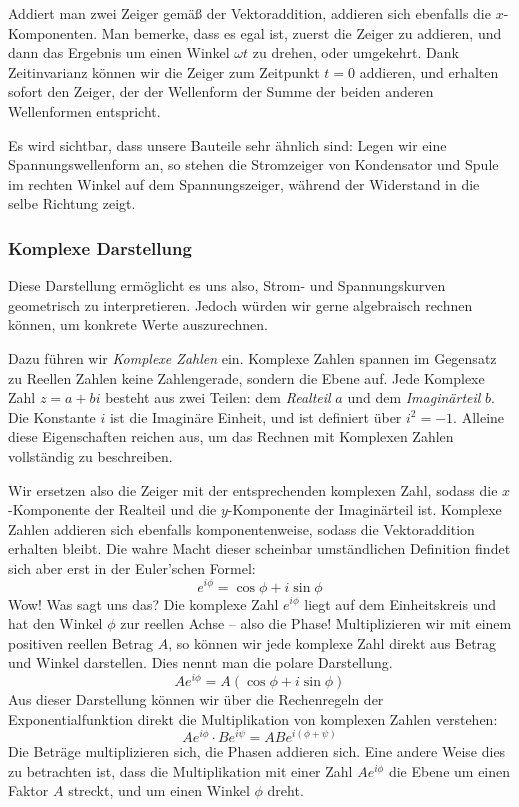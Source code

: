 Addiert man zwei Zeiger gemäß der Vektoraddition, addieren sich ebenfalls die $x$-Komponenten. Man bemerke, dass es egal
ist, zuerst die Zeiger zu addieren, und dann das Ergebnis um einen Winkel $\omega t$ zu drehen, oder umgekehrt. Dank
Zeitinvarianz können wir die Zeiger zum Zeitpunkt $t = 0$ addieren, und erhalten sofort den Zeiger, der der Wellenform
der Summe der beiden anderen Wellenformen entspricht.

Es wird sichtbar, dass unsere Bauteile sehr ähnlich sind: Legen wir eine Spannungswellenform an, so stehen die
Stromzeiger von Kondensator und Spule im rechten Winkel auf dem Spannungszeiger, während der Widerstand in die selbe
Richtung zeigt.
\subsubsection{Komplexe Darstellung}
Diese Darstellung ermöglicht es uns also, Strom- und Spannungskurven geometrisch zu interpretieren. Jedoch würden wir gerne
algebraisch rechnen können, um konkrete Werte auszurechnen.


Dazu führen wir \emph{Komplexe Zahlen} ein. Komplexe Zahlen spannen im Gegensatz zu Reellen Zahlen keine Zahlengerade,
sondern die Ebene auf. Jede Komplexe Zahl $z = a+bi$ besteht aus zwei Teilen: dem \emph{Realteil} $a$ und dem
\emph{Imaginärteil} $b$. Die Konstante $i$ ist die Imaginäre Einheit, und ist definiert über $i^2 = -1$. Alleine diese
Eigenschaften reichen aus, um das Rechnen mit Komplexen Zahlen vollständig zu beschreiben.

Wir ersetzen also die Zeiger mit der entsprechenden komplexen Zahl, sodass die $x$-Komponente der Realteil und die
$y$-Komponente der Imaginärteil ist. Komplexe Zahlen addieren sich ebenfalls komponentenweise, sodass die Vektoraddition
erhalten bleibt. Die wahre Macht dieser scheinbar umständlichen Definition findet sich aber erst in der Euler'schen
Formel:
\begin{equation}\label{eq:euler}
    e^{i\phi} = \cos \phi + i\sin \phi
\end{equation}
Wow! Was sagt uns das? Die komplexe Zahl $e^{i\phi}$ liegt auf dem Einheitskreis und hat den Winkel $\phi$ zur reellen
Achse -- also die Phase! Multiplizieren wir mit einem positiven reellen Betrag $A$, so können wir jede komplexe Zahl direkt
aus Betrag und Winkel darstellen. Dies nennt man die polare Darstellung.
\begin{equation}\label{eq:polar}
    Ae^{i\phi} = A(\cos \phi + i\sin \phi)
\end{equation}
Aus dieser Darstellung können wir über die Rechenregeln der Exponentialfunktion direkt die Multiplikation von komplexen
Zahlen verstehen:
\[ Ae^{i\phi} \cdot Be^{i\psi} = ABe^{i(\phi+\psi)} \]
Die Beträge multiplizieren sich, die Phasen addieren sich. Eine andere Weise dies zu betrachten ist, dass die
Multiplikation mit einer Zahl $Ae^{i\phi}$ die Ebene um einen Faktor $A$ streckt, und um einen Winkel $\phi$ dreht.

